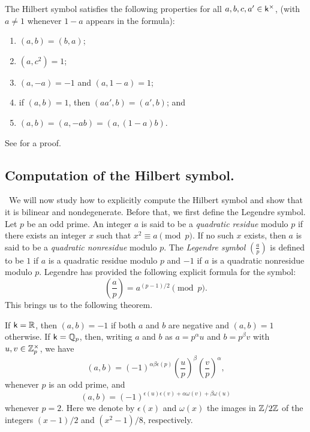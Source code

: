 \begin{theorem}
    The Hilbert symbol satisfies the following properties for all \(a, b, c, a' \in \mathsf{k}^{\times}\), (with \(a \neq 1\) whenever \(1-a\) appears in the formula):

    \smallskip

    \begin{enumerate}[nosep, label=(\alph*)]
        \item \((a, b) = (b, a)\);
        \item \((a, c^2) = 1\);
        \item \((a, -a) = -1\) and \((a, 1-a) = 1\);
        \item if \((a, b) = 1\), then \((aa', b) = (a', b)\); and
        \item \((a, b) = (a, -ab) = (a, (1-a)b)\).\label{item:formula-e}
    \end{enumerate}
\end{theorem}

See \cite[pp.~19--21]{serre2012course} for a proof.

\subsection{Computation of the Hilbert symbol.}~We will now study how to explicitly compute the Hilbert symbol and show that it is bilinear and nondegenerate. Before that, we first define the {Legendre symbol}. Let \(p\) be an odd prime. An integer \(a\) is said to be a \emph{quadratic residue} modulo \(p\) if there exists an integer \(x\) such that \(x^2 \equiv a \pmod{p}\). If no such \(x\) exists, then \(a\) is said to be a \emph{quadratic nonresidue} modulo \(p\). The \emph{Legendre symbol} \(\left(\frac{a}{p}\right)\) is defined to be \(1\) if \(a\) is a quadratic residue modulo \(p\) and \(-1\) if \(a\) is a quadratic nonresidue modulo \(p\). Legendre has provided the following explicit formula for the symbol:\label{sec:computing-hilbert-symbol}
\[
       \left(\frac{a}{p}\right) = a^{(p-1)/2} \pmod{p}.  
\]
This brings us to the following theorem.
\begin{theorem}
    {\normalfont\cite[pp.~20--21]{serre2012course}}
    If \(\mathsf{k} = \mathbb{R}\), then \((a, b) = -1\) if both \(a\) and \(b\) are negative and \((a, b) = 1\) otherwise. If \(\mathsf{k} = \mathbb{Q}_p\), then, writing \(a\) and \(b\) as \(a = p^\alpha u\) and \(b = p^\beta v\) with \(u, v \in \mathbb{Z}_p^{\times}\), we have
    \[
        (a, b) = (-1)^{\alpha\beta\epsilon(p)}\left(\frac{u}{p}\right)^{\beta}\left(\frac{v}{p}\right)^{\alpha},
    \]
    whenever \(p\) is an odd prime, and 
    \[
        (a, b) = (-1)^{\epsilon(u)\epsilon(v) + \alpha\omega(v) + \beta\omega(u)}
    \]
    whenever \(p = 2\). Here we denote by \(\epsilon(x)\) and \(\omega(x)\) the images in \(\mathbb{Z}/2\mathbb{Z}\) of the integers \((x-1)/2\) and \((x^2-1)/8\), respectively.
\end{theorem}

